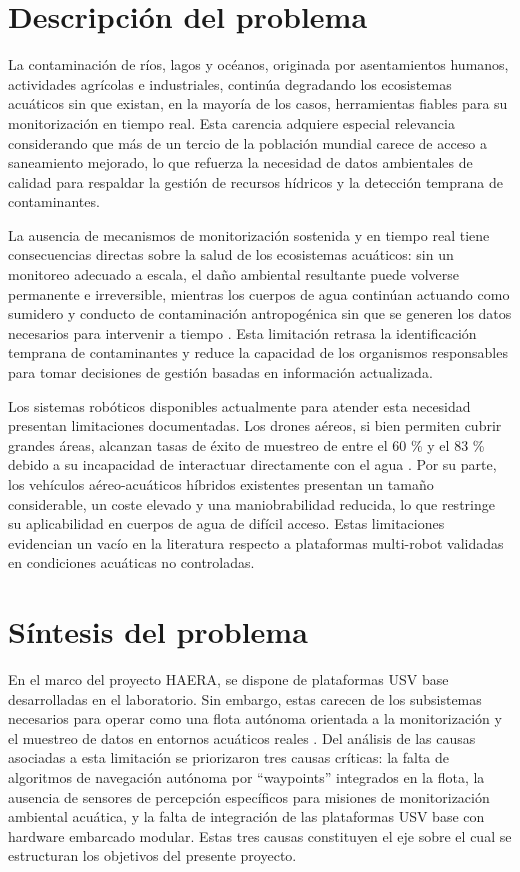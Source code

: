 \section{Descripción del problema}

La contaminación de ríos, lagos y océanos, originada por asentamientos humanos, actividades agrícolas e industriales, continúa degradando los ecosistemas acuáticos 
sin que existan, en la mayoría de los casos, herramientas fiables para su monitorización en tiempo real. Esta carencia adquiere especial relevancia considerando que 
más de un tercio de la población mundial carece de acceso a saneamiento mejorado, lo que refuerza la necesidad de datos ambientales de calidad para respaldar la 
gestión de recursos hídricos y la detección temprana de contaminantes\cite{Cite5}.

La ausencia de mecanismos de monitorización sostenida y en tiempo real tiene consecuencias directas sobre la salud de los ecosistemas acuáticos: sin un monitoreo 
adecuado a escala, el daño ambiental resultante puede volverse permanente e irreversible, mientras los cuerpos de agua continúan actuando como sumidero y conducto de 
contaminación antropogénica sin que se generen los datos necesarios para intervenir a tiempo \cite{Cite6}. Esta limitación retrasa la identificación temprana de contaminantes 
y reduce la capacidad de los organismos responsables para tomar decisiones de gestión basadas en información actualizada.

Los sistemas robóticos disponibles actualmente para atender esta necesidad presentan limitaciones documentadas. Los drones aéreos, si bien permiten cubrir grandes 
áreas, alcanzan tasas de éxito de muestreo de entre el 60 {\%} y el 83 {\%} debido a su incapacidad de interactuar directamente con el agua \cite{Cite4}. Por su parte, los vehículos 
aéreo-acuáticos híbridos existentes presentan un tamaño considerable, un coste elevado y una maniobrabilidad reducida, lo que restringe su aplicabilidad en cuerpos de 
agua de difícil acceso. Estas limitaciones evidencian un vacío en la literatura respecto a plataformas multi-robot validadas en condiciones acuáticas no controladas\cite{Cite2}.

\section{Síntesis del problema}

En el marco del proyecto HAERA, se dispone de plataformas USV base desarrolladas en el laboratorio. Sin embargo, estas carecen de los subsistemas necesarios para operar 
como una flota autónoma orientada a la monitorización y el muestreo de datos en entornos acuáticos reales \cite{Cite2}. Del análisis de las causas asociadas a esta limitación se priorizaron tres causas críticas: la falta de algoritmos de navegación 
autónoma por \enquote{waypoints} integrados en la flota, la ausencia de sensores de percepción específicos para misiones de monitorización ambiental acuática, y la falta de 
integración de las plataformas USV base con hardware embarcado modular. Estas tres causas constituyen el eje sobre el cual se estructuran los objetivos del presente proyecto.


